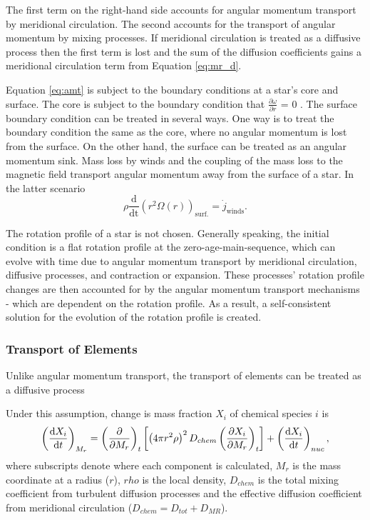 The first term on the right-hand side accounts for angular momentum transport by meridional circulation. 
The second accounts for the transport of angular momentum by mixing processes.
If meridional circulation is treated as a diffusive process then the first term is lost and the sum of the diffusion coefficients gains a meridional circulation term from Equation \ref{eq:mr_d}.

Equation \ref{eq:amt} is subject to the boundary conditions at a star's core and surface.
The core is subject to the boundary condition that $\frac{\partial \omega}{\partial r}$ = 0 \citep{talon_anisotropic_1997,denissenkov_angular_2010}.
The surface boundary condition can be treated in several ways.
One way is to treat the boundary condition the same as the core, where no angular momentum is lost from the surface.
On the other hand, the surface can be treated as an angular momentum sink.
Mass loss by winds and the coupling of the mass loss to the magnetic field transport angular momentum away from the surface of a star.
In the latter scenario
\begin{equation}
    \rho \frac{\text{d}}{\text{dt}}\left(r^2 \Omega \left( r \right)\right)_{\text{surf.}} = \Dot{j}_{\text{winds}}.
\end{equation}

The rotation profile of a star is not chosen.
Generally speaking, the initial condition is a flat rotation profile at the zero-age-main-sequence, which can evolve with time due to angular momentum transport by meridional circulation, diffusive processes, and contraction or expansion.
These processes' rotation profile changes are then accounted for by the angular momentum transport mechanisms - which are dependent on the rotation profile.
As a result, a self-consistent solution for the evolution of the rotation profile is created.

\subsubsection{Transport of Elements}

Unlike angular momentum transport, the transport of elements can be treated as a diffusive process \citep{endal_evolution_1978,heger_presupernova_2000}

Under this assumption, change is mass fraction $X_i$ of chemical species $i$ is
\begin{equation}
    \left(\frac{\textmd{d} X_i}{\textmd{d} t}\right)_{M_r} = \left(\frac{\partial}{\partial M_r}\right)_t \left[ \left(4\pi r^2 \rho \right)^2 D_{chem} \left(\frac{\partial X_i}{\partial M_r}\right)_t\right] + \left(\frac{\textmd{d} X_i }  { \textmd{d} t}\right)_{nuc},
\end{equation}
where subscripts denote where each component is calculated, $M_r$ is the mass coordinate at a radius ($r$), $rho$ is the local density, $D_{chem}$ is the total mixing coefficient from turbulent diffusion processes and the effective diffusion coefficient from meridional circulation ($D_{chem} = D_{tot} + D_{MR}$). 

